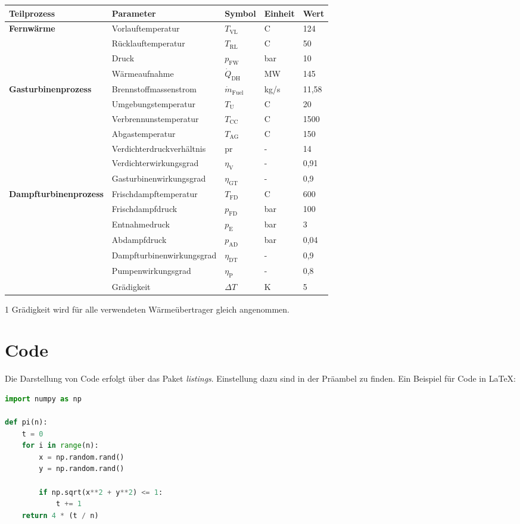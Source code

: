     	\begin{center}
    		\begin{threeparttable}
        		\begin{tabular}{lllll}
        			\hline 
        			Teilprozess & Parameter  & Symbol  & Einheit  & Wert\tabularnewline
        			\hline 
        			\textbf{Fernwärme} & Vorlauftemperatur  & $T_{\text{VL}}$  & \textdegree C  &  124\tabularnewline
        			& Rücklauftemperatur  & $T_{\text{RL}}$  & \textdegree C  & 50\tabularnewline
        			& Druck  & $p_{\text{FW}}$  & bar  & 10\tabularnewline
        			& Wärmeaufnahme & $\dot{Q}_\text{DH}$ & MW & 145 \tabularnewline
        			\textbf{Gasturbinenprozess} & Brennstoffmassenstrom  & $\dot{m}_{\text{Fuel}}$  & kg/s  & 11,58 \tabularnewline
        			& Umgebungstemperatur  & $T_{\text{U}}$  & \textdegree C & 20 \tabularnewline
        			& Verbrennunstemperatur  & $T_{\text{CC}}$  & \textdegree C & 1500 \tabularnewline
        			& Abgastemperatur  & $T_{\text{AG}}$  & \textdegree C & 150 \tabularnewline
        			& Verdichterdruckverhältnis  & pr  & - & 14 \tabularnewline
        			& Verdichterwirkungsgrad  & $\eta_{\text{V}}$  & - & 0,91 \tabularnewline
        			& Gasturbinenwirkungsgrad  & $\eta_{\text{GT}}$  & - & 0,9 \tabularnewline
        			\textbf{Dampfturbinenprozess} & Frischdampftemperatur  & $T_{\text{FD}}$  & \textdegree C & 600 \tabularnewline
        			& Frischdampfdruck  & $p_{\text{FD}}$  & bar & 100 \tabularnewline
        			& Entnahmedruck  & $p_{\text{E}}$  & bar & 3 \tabularnewline
        			& Abdampfdruck  & $p_{\text{AD}}$  & bar & 0,04 \tabularnewline
        			& Dampfturbinenwirkungsgrad  & $\eta_{\text{DT}}$  & - & 0,9 \tabularnewline
        			& Pumpenwirkungsgrad  & $\eta_{\text{P}}$  & - & 0,8 \tabularnewline
        			& Grädigkeit\tnote{1}  & $\Delta T$  & K & 5 \tabularnewline
        			\hline 
        		\end{tabular}
    
    		\begin{tablenotes}\footnotesize 
    			\item[1] Grädigkeit wird für alle verwendeten Wärmeübertrager gleich angenommen.
    		\end{tablenotes}
    	\end{threeparttable}
    	\label{tab: Nennparameter GuD}
	\end{center} 

    \section{Code}
        Die Darstellung von Code erfolgt über das Paket \textit{listings}. Einstellung dazu sind in der Präambel zu finden. Ein Beispiel für Code in \LaTeX:
        \begin{lstlisting}[language=python,numbers=none]
import numpy as np

def pi(n):
    t = 0
    for i in range(n):
        x = np.random.rand()
        y = np.random.rand()
        
        if np.sqrt(x**2 + y**2) <= 1:
            t += 1
    return 4 * (t / n)
\end{lstlisting}   
